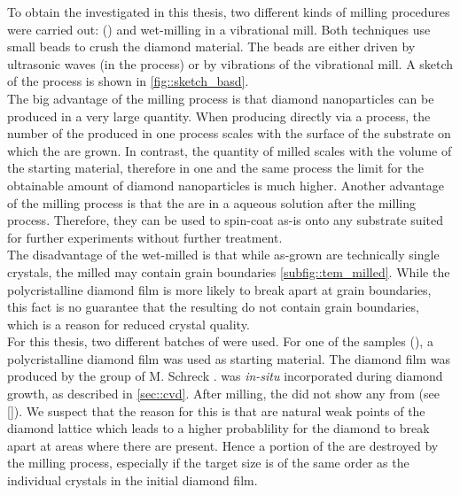 	To obtain the \nds investigated in this thesis, two different kinds of milling procedures were carried out: \basd (\BASD) and wet-milling in a vibrational mill.
	Both techniques use small beads to crush the diamond material. 
	The beads are either driven by ultrasonic waves (in the \BASD process) or by vibrations of the vibrational mill.
	A sketch of the process is shown in \autoref{fig::sketch_basd}.
	\\
	The big advantage of the milling process is that diamond nanoparticles can be produced in a very large quantity.
	When producing \nds directly via a \CVD process, the number of the produced \nds in one process scales with the surface of the substrate on which the \nds are grown.
	In contrast, the quantity of milled \nds scales with the volume of the starting material, therefore in one and the same process the limit for the obtainable amount of diamond nanoparticles is much higher.
	Another advantage of the milling process is that the \nds are in a aqueous solution after the milling process.
	Therefore, they can be used to spin-coat as-is onto any substrate suited for further experiments without further treatment.
	\\
	The disadvantage of the wet-milled \nds is that while as-grown \CVD \nds are technically single crystals, the milled \nds may contain grain boundaries \autoref{subfig::tem_milled}.
	While the polycristalline diamond film is more likely to break apart at grain boundaries, this fact is no guarantee that the resulting \nds do not contain grain boundaries, which is a reason for reduced crystal quality.
	\\
	For this thesis, two different batches of \BASD \nds were used.
	For one of the samples (\basdes), a polycristalline diamond film was used as starting material.
	The diamond film was produced by the group of M. Schreck \cite{}.
	\Si was \textit{in-situ} incorporated during diamond growth, as described in \autoref{sec::cvd}.
	After milling, the \nds did not show any \pl from \sivs (see \autoref{}).
	We suspect that the reason for this is that \sivs are natural weak points of the diamond lattice which leads to a higher probablility for the diamond to break apart at areas where there are \sivs present.
	Hence a portion of the \sivs are destroyed by the milling process, especially if the target \nd size is of the same order as the individual crystals in the initial diamond film.
